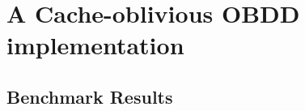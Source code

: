 \section{A Cache-oblivious OBDD implementation} \label{sec:implementation}

\subsection{Benchmark Results} \label{sec:implementation__benchmarks}



